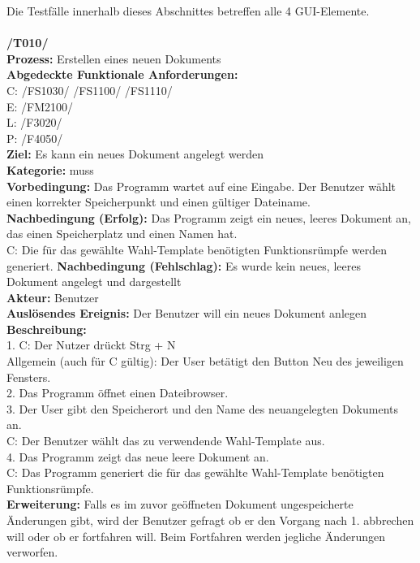 \documentclass[a4paper]{scrreprt}
\begin{document}
Die Testfälle innerhalb dieses Abschnittes betreffen alle 4 GUI-Elemente. \\\\
\textbf{/T010/}\\
\textbf{Prozess: }Erstellen eines neuen Dokuments  \\
\textbf{Abgedeckte Funktionale Anforderungen:} \\
C: /FS1030/ /FS1100/ /FS1110/ \\
E: /FM2100/	\\
L: /F3020/ \\
P: /F4050/	\\
\textbf{Ziel:} Es kann ein neues Dokument angelegt werden\\
\textbf{Kategorie:} muss\\
\textbf{Vorbedingung:} Das Programm wartet auf eine Eingabe. Der Benutzer wählt einen korrekter Speicherpunkt und einen gültiger Dateiname.\\
\textbf{Nachbedingung (Erfolg):} Das Programm zeigt ein neues, leeres Dokument an, das einen Speicherplatz und einen Namen hat.\\
C: Die für das gewählte Wahl-Template benötigten Funktionsrümpfe werden generiert.
\textbf{Nachbedingung (Fehlschlag):} Es wurde kein neues, leeres Dokument angelegt und dargestellt\\
\textbf{Akteur:} Benutzer\\
\textbf{Auslösendes Ereignis:} Der Benutzer will ein neues Dokument anlegen\\
\textbf{Beschreibung:} \\
1. C: Der Nutzer drückt Strg + N \\
Allgemein (auch für C gültig): Der User betätigt den Button Neu des jeweiligen Fensters. \\
2. Das Programm öffnet einen Dateibrowser.\\
3. Der User gibt den Speicherort und den Name des neuangelegten Dokuments an. \\
C: Der Benutzer wählt das zu verwendende Wahl-Template aus.\\
4. Das Programm zeigt das neue leere Dokument an. \\
C: Das Programm generiert die für das gewählte Wahl-Template benötigten Funktionsrümpfe. \\
\textbf {Erweiterung:} Falls es im zuvor geöffneten Dokument ungespeicherte Änderungen gibt, wird der Benutzer gefragt ob er den Vorgang nach 1. abbrechen will oder ob er fortfahren will. Beim Fortfahren werden jegliche Änderungen verworfen. \\
\end{document}
